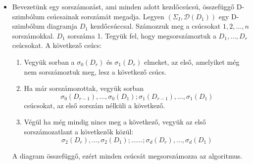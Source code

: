 \documentclass[12pt,magyar,a4paper]{article}
\begin{document}
\begin{itemize}
  \item Bevezetünk egy sorszámozást, ami minden adott kezdőcsúcsú, összefüggő
    D-szimbólum csúcsainak sorszámát megadja.
    Legyen $(\Sigma_I,\mathcal{D}(D_1))$ egy D-szimbólum diagramja $D_1$
    kezdőcsúccsal. Számozzuk meg a csúcsokat $1,2,\ldots ,n$ sorszámokkal.
    $D_1$ sorszáma 1. Tegyük fel, hogy megsorszámoztuk a $D_1,\ldots,D_r$
    csúcsokat. A következő csúcs:
    \begin{enumerate}
      \item Vegyük sorban a $\sigma_0(D_r)$ és $\sigma_1(D_r)$ elmeket, az első,
	amelyiket még nem sorszámoztuk meg, lesz a következő csúcs.
      \item Ha már sorszámozottak, vegyük sorban
	\begin{equation*}
	  \sigma_0(D_{r-1}),\ldots,\sigma_0(D_1);\sigma_1(D_{r-1}),\ldots, \sigma_1(D_1)
	\end{equation*}
	csúcsokat, az első sorszám nélküli a következő.
      \item Végül ha még mindig nincs meg a következő, vegyük az első
	sorszámozatlant a következők közül:
	\begin{equation*}
	  \sigma_2(D_r),\ldots,\sigma_2(D_1); \ldots\ldots; \sigma_d(D_r),\ldots,\sigma_d(D_1)
	\end{equation*}
    \end{enumerate}

    A diagram összefüggő, ezért minden csúcsát megsorszámozza az algoritmus.


\end{itemize}
\end{document}
